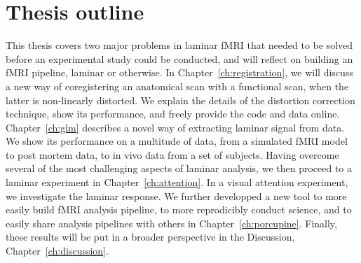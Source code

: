 
\section*{Thesis outline}
This thesis covers two major problems in laminar fMRI that needed to be solved before an experimental study could be conducted, and will reflect on building an fMRI pipeline, laminar or otherwise. In Chapter~\ref{ch:registration}, we will discuss a new way of coregistering an anatomical scan with a functional scan, when the latter is non-linearly distorted. We explain the details of the distortion correction technique, show its performance, and freely provide the code and data online. Chapter~\ref{ch:glm} describes a novel way of extracting laminar signal from data. We show its performance on a multitude of data, from a simulated fMRI model to post mortem data, to in vivo data from a set of subjects. Having overcome several of the most challenging aspects of laminar analysis, we then proceed to a laminar experiment in Chapter~\ref{ch:attention}. In a visual attention experiment, we investigate the laminar response. We further developped a new tool to more easily build fMRI analysis pipeline, to more reprodicibly conduct science, and to easily share analysis pipelines with others in Chapter~\ref{ch:porcupine}. Finally, these results will be put in a broader perspective in the Discussion, Chapter~\ref{ch:discussion}.
